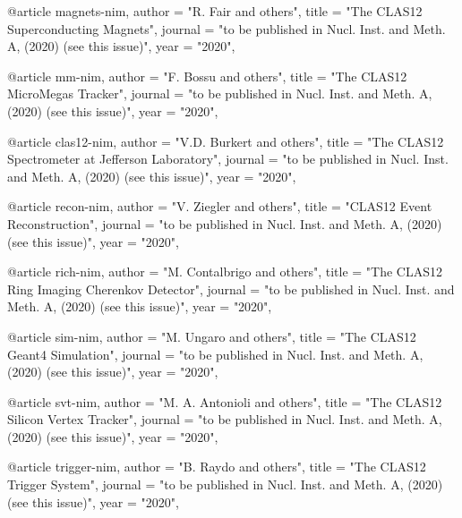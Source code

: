 @article{
magnets-nim,
author         = "R. Fair and others",
title          = "{The CLAS12 Superconducting Magnets}",
journal        = "to be published in Nucl. Inst. and Meth. A, (2020) (see this issue)",
year           = "2020",
}

@article{
mm-nim,
author         = "F. Bossu and others",
title          = "{The CLAS12 MicroMegas Tracker}",
journal        = "to be published in Nucl. Inst. and Meth. A, (2020) (see this issue)",
year           = "2020",
}

@article{
clas12-nim,
author         = "V.D. Burkert and others",
title          = "{The CLAS12 Spectrometer at Jefferson Laboratory}",
journal        = "to be published in Nucl. Inst. and Meth. A, (2020) (see this issue)",
year           = "2020",
}

@article{
recon-nim,
author         = "V. Ziegler and others",
title          = "{CLAS12 Event Reconstruction}",
journal        = "to be published in Nucl. Inst. and Meth. A, (2020) (see this issue)",
year           = "2020",
}

@article{
rich-nim,
author         = "M. Contalbrigo and others",
title          = "{The CLAS12 Ring Imaging Cherenkov Detector}",
journal        = "to be published in Nucl. Inst. and Meth. A, (2020) (see this issue)",
year           = "2020",
}

@article{
sim-nim,
author         = "M. Ungaro and others",
title          = "{The CLAS12 Geant4 Simulation}",
journal        = "to be published in Nucl. Inst. and Meth. A, (2020) (see this issue)",
year           = "2020",
}

@article{
svt-nim,
author         = "M. A. Antonioli and others",
title          = "{The CLAS12 Silicon Vertex Tracker}",
journal        = "to be published in Nucl. Inst. and Meth. A, (2020) (see this issue)",
year           = "2020",
}

@article{
trigger-nim,
author         = "B. Raydo and others",
title          = "{The CLAS12 Trigger System}",
journal        = "to be published in Nucl. Inst. and Meth. A, (2020) (see this issue)",
year           = "2020",
}


